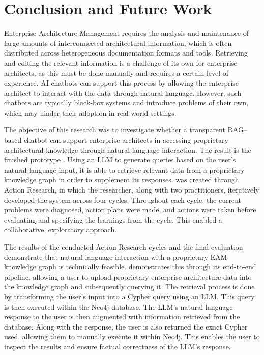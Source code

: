 \chapter{Conclusion and Future Work}
\label{ch:conclusion}
Enterprise Architecture Management requires the analysis and maintenance of large amounts of interconnected architectural information, which is often distributed across heterogeneous documentation formats and tools. Retrieving and editing the relevant information is a challenge of its own for enterprise architects, as this must be done manually and requires a certain level of experience. AI chatbots can support this process by allowing the enterprise architect to interact with the data through natural language. However, such chatbots are typically black-box systems and introduce problems of their own, which may hinder their adoption in real-world settings.

The objective of this research was to investigate whether a transparent RAG–based chatbot can support enterprise architects in accessing proprietary architectural knowledge through natural language interaction. The result is the finished prototype \prototype{}. Using an LLM to generate queries based on the user's natural language input, it is able to retrieve relevant data from a proprietary knowledge graph in order to supplement its responses. \prototype{} was created through Action Research, in which the researcher, along with two practitioners, iteratively developed the system across four cycles. Throughout each cycle, the current problems were diagnosed, action plans were made, and actions were taken before evaluating and specifying the learnings from the cycle. This enabled a collaborative, exploratory approach.

The results of the conducted Action Research cycles and the final evaluation demonstrate that natural language interaction with a proprietary EAM knowledge graph is technically feasible. \prototype{} demonstrates this through its end-to-end pipeline, allowing a user to upload proprietary enterprise architecture data into the knowledge graph and subsequently querying it. The retrieval process is done by transforming the user's input into a Cypher query using an LLM. This query is then executed within the Neo4j database. The LLM's natural-language response to the user is then augmented with information retrieved from the database. Along with the response, the user is also returned the exact Cypher used, allowing them to manually execute it within Neo4j. This enables the user to inspect the results and ensure factual correctness of the LLM's response.

